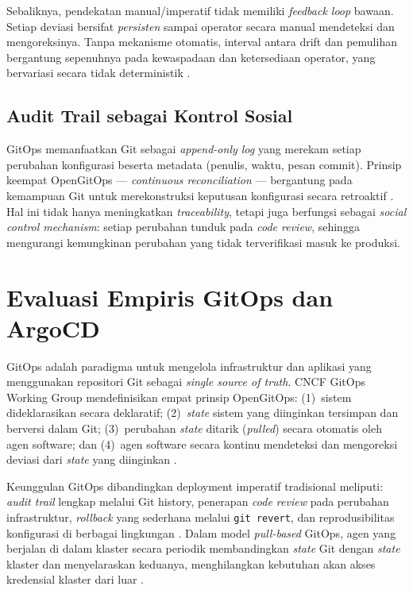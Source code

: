 Sebaliknya, pendekatan manual/imperatif tidak memiliki \textit{feedback loop} bawaan. Setiap deviasi bersifat \textit{persisten} sampai operator secara manual mendeteksi dan mengoreksinya. Tanpa mekanisme otomatis, interval antara drift dan pemulihan bergantung sepenuhnya pada kewaspadaan dan ketersediaan operator, yang bervariasi secara tidak deterministik \citep{pohjola2025mitigating}.

\subsection{Audit Trail sebagai Kontrol Sosial}

GitOps memanfaatkan Git sebagai \textit{append-only log} yang merekam setiap perubahan konfigurasi beserta metadata (penulis, waktu, pesan commit). Prinsip keempat OpenGitOps --- \textit{continuous reconciliation} --- bergantung pada kemampuan Git untuk merekonstruksi keputusan konfigurasi secara retroaktif \citep{opengitops2021}. Hal ini tidak hanya meningkatkan \textit{traceability}, tetapi juga berfungsi sebagai \textit{social control mechanism}: setiap perubahan tunduk pada \textit{code review}, sehingga mengurangi kemungkinan perubahan yang tidak terverifikasi masuk ke produksi.

\section{Evaluasi Empiris GitOps dan ArgoCD}

GitOps adalah paradigma untuk mengelola infrastruktur dan aplikasi yang menggunakan repositori Git sebagai \textit{single source of truth}. CNCF GitOps Working Group mendefinisikan empat prinsip OpenGitOps: (1)~sistem dideklarasikan secara deklaratif; (2)~\textit{state} sistem yang diinginkan tersimpan dan berversi dalam Git; (3)~perubahan \textit{state} ditarik (\textit{pulled}) secara otomatis oleh agen software; dan (4)~agen software secara kontinu mendeteksi dan mengoreksi deviasi dari \textit{state} yang diinginkan \citep{opengitops2021}.

Keunggulan GitOps dibandingkan deployment imperatif tradisional meliputi: \textit{audit trail} lengkap melalui Git history, penerapan \textit{code review} pada perubahan infrastruktur, \textit{rollback} yang sederhana melalui \texttt{git revert}, dan reprodusibilitas konfigurasi di berbagai lingkungan \citep{yuen2021gitops}. Dalam model \textit{pull-based} GitOps, agen yang berjalan di dalam klaster secara periodik membandingkan \textit{state} Git dengan \textit{state} klaster dan menyelaraskan keduanya, menghilangkan kebutuhan akan akses kredensial klaster dari luar \citep{utami2021analysis}.

